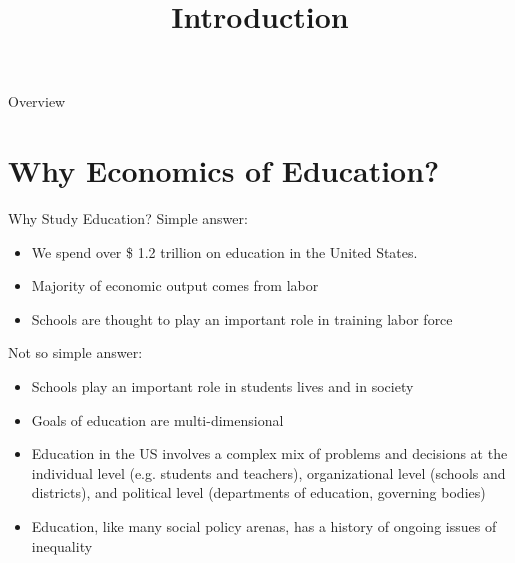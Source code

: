 \documentclass{beamer}
\title{Introduction}
\begin{document}
\maketitle

\begin{frame}{Overview}
\tableofcontents
\end{frame}

\section{Why Economics of Education?}
\begin{frame}{Why Study Education?}
Simple answer:   
   \begin{itemize}
       \item We spend over \$ 1.2 trillion on education in the United States. 
       \item Majority of economic output comes from labor
       \item Schools are thought to play an important role in training labor force
   \end{itemize}
Not so simple answer:
    \begin{itemize}
        \item Schools play an important role in students lives and in society
        \item Goals of education are multi-dimensional
        \item Education in the US involves a complex mix of problems and decisions at the individual level (e.g. students and teachers), organizational level (schools and districts), and political level (departments of education, governing bodies)
        \item Education, like many social policy arenas, has a history of ongoing issues of inequality
    \end{itemize}
\end{frame}
\end{document}
